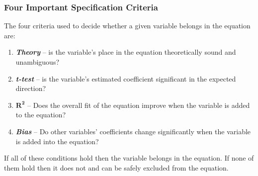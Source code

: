 \documentclass[11pt]{article}
\begin{document}
\subsubsection{Four Important Specification Criteria}
The four criteria used to decide whether a given variable belongs in the equation are:
\begin{enumerate}
\item \textbf{\textit{Theory}} -- is the variable's place in the equation theoretically sound and unambiguous?
\item \textbf{\textit{\textit{t}-test}} -- is the variable's estimated coefficient significant in the expected direction?
\item $\boldsymbol{R^2}$ -- Does the overall fit of the equation improve when the variable is added to the equation?
\item \textbf{\textit{Bias}} -- Do other variables' coefficients change significantly when the variable is added into the equation?
\end{enumerate}
If all of these conditions hold then the variable belongs in the equation. If none of them hold then it does not and can be safely excluded from the equation. 
\end{document}
